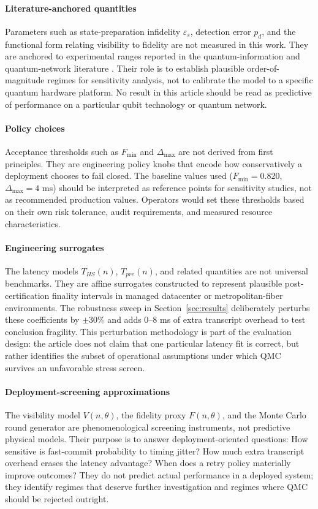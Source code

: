 \documentclass{ieeeaccess}
\begin{document}
\paragraph{Literature-anchored quantities}
Parameters such as state-preparation infidelity $\varepsilon_s$, detection error $p_d$, and the functional form relating visibility to fidelity are not measured in this work. They are anchored to experimental ranges reported in the quantum-information and quantum-network literature \cite{b12,b19,b20,b21,b22,b23}. Their role is to establish plausible order-of-magnitude regimes for sensitivity analysis, not to calibrate the model to a specific quantum hardware platform. No result in this article should be read as predictive of performance on a particular qubit technology or quantum network.

\paragraph{Policy choices}
Acceptance thresholds such as $F_{\min}$ and $\Delta_{\max}$ are not derived from first principles. They are engineering policy knobs that encode how conservatively a deployment chooses to fail closed. The baseline values used ($F_{\min}=0.820$, $\Delta_{\max}=4$ ms) should be interpreted as reference points for sensitivity studies, not as recommended production values. Operators would set these thresholds based on their own risk tolerance, audit requirements, and measured resource characteristics.

\paragraph{Engineering surrogates}
The latency models $T_{HS}(n)$, $T_{pre}(n)$, and related quantities are not universal benchmarks. They are affine surrogates constructed to represent plausible post-certification finality intervals in managed datacenter or metropolitan-fiber environments. The robustness sweep in Section~\ref{sec:results} deliberately perturbs these coefficients by $\pm 30\%$ and adds $0$--$8$ ms of extra transcript overhead to test conclusion fragility. This perturbation methodology is part of the evaluation design: the article does not claim that one particular latency fit is correct, but rather identifies the subset of operational assumptions under which QMC survives an unfavorable stress screen.

\paragraph{Deployment-screening approximations}
The visibility model $V(n,\theta)$, the fidelity proxy $F(n,\theta)$, and the Monte Carlo round generator are phenomenological screening instruments, not predictive physical models. Their purpose is to answer deployment-oriented questions: How sensitive is fast-commit probability to timing jitter? How much extra transcript overhead erases the latency advantage? When does a retry policy materially improve outcomes? They do not predict actual performance in a deployed system; they identify regimes that deserve further investigation and regimes where QMC should be rejected outright.
\end{document}
